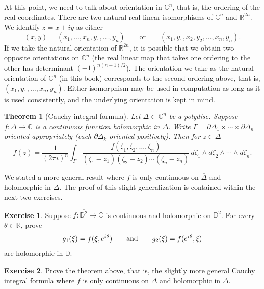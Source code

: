 \documentclass[12pt,openany]{book}
\newcommand{\avoidbreak}{\postdisplaypenalty=100}
\newcommand{\C}{{\mathbb{C}}}
\newcommand{\R}{{\mathbb{R}}}
\newcommand{\D}{{\mathbb{D}}}
\theoremstyle{plain}
\newtheorem{thm}{Theorem}[section]
\theoremstyle{remark}
\theoremstyle{definition}
\newenvironment{exbox}{%
    \def\FrameCommand{\vrule width 1pt \relax\hspace{10pt}}%
    \MakeFramed{\advance\hsize-\width\FrameRestore}%
}{%
    \endMakeFramed
}
\theoremstyle{exercise}
\newtheorem{exercise}{Exercise}[section]
\theoremstyle{example}
\begin{document}
At this point, we need to talk about orientation in $\C^n$, that is,
the ordering of the real coordinates.  There are two
natural real-linear isomorphisms of $\C^n$ and $\R^{2n}$.  We
identify $z = x+iy$ as either
\begin{equation*}
(x,y) = (x_1,\ldots,x_n,y_1,\ldots,y_n) \qquad
\text{or} \qquad
(x_1,y_1,x_2,y_2,\ldots,x_n,y_n) .
\end{equation*}
If we take the natural orientation of $\R^{2n}$,
it is possible that we obtain
two opposite orientations on $\C^n$ (the real linear map
that takes one ordering to the other has determinant ${(-1)}^{n(n-1)/2}$).
The orientation we take as the natural orientation of $\C^n$ (in this book)
corresponds to
the second ordering above, that
is, $(x_1,y_1,\ldots,x_n,y_n)$.  Either isomorphism may be used
in computation as long as it is used consistently, and the underlying
orientation is kept in mind.

\begin{thm}[Cauchy integral formula]
Let $\Delta \subset \C^n$ be a polydisc.
Suppose
$f \colon \overline{\Delta} \to \C$ is a continuous function
holomorphic in $\Delta$.
Write $\Gamma = \partial \Delta_1 \times \cdots \times \partial \Delta_n$
oriented appropriately (each $\partial \Delta_k$ oriented positively).
Then for $z \in \Delta$
\begin{equation*}
f(z) =
\frac{1}{{(2\pi i)}^n}
\int_{\Gamma}
\frac{f(\zeta_1,\zeta_2,\ldots,\zeta_n)}{(\zeta_1-z_1)(\zeta_2-z_2)\cdots(\zeta_n-z_n)}
\,
d \zeta_1
\wedge
d \zeta_2
\wedge
\cdots
\wedge
d \zeta_n .
\end{equation*}
\end{thm}

We stated a more general result where $f$ is only continuous
on $\overline{\Delta}$ and holomorphic in $\Delta$.  The proof of this
slight generalization is contained within the next two exercises.

\begin{exbox}
\begin{exercise}
Suppose $f \colon \overline{\D^2} \to \C$ is continuous and holomorphic
on $\D^2$.  For every $\theta \in \R$, prove
\begin{equation*}
g_1(\xi) = f(\xi,e^{i\theta}) \qquad \text{and} \qquad
g_2(\xi) = f(e^{i\theta},\xi)
\avoidbreak
\end{equation*}
are holomorphic in $\D$.
\end{exercise}

\begin{exercise}
Prove the theorem above, that is, the slightly more general Cauchy integral
formula where $f$ is only continuous on $\overline{\Delta}$ and
holomorphic in $\Delta$.
\end{exercise}
\end{exbox}
\end{document}

